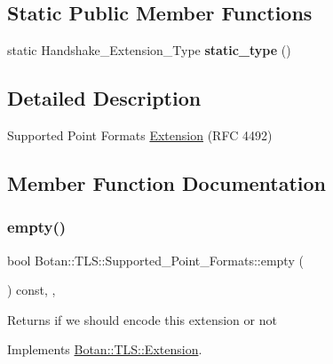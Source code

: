 \subsection*{Static Public Member Functions}
\begin{DoxyCompactItemize}
\item 
\mbox{\label{class_botan_1_1_t_l_s_1_1_supported___point___formats_a6cfd288d6ba096435f7675aa2aa627ce}} 
static Handshake\+\_\+\+Extension\+\_\+\+Type {\bfseries static\+\_\+type} ()
\end{DoxyCompactItemize}


\subsection{Detailed Description}
Supported Point Formats \hyperlink{class_botan_1_1_t_l_s_1_1_extension}{Extension} (R\+FC 4492) 

\subsection{Member Function Documentation}
\mbox{\label{class_botan_1_1_t_l_s_1_1_supported___point___formats_a66014f1fe0e75931f0c7a682aa9d9083}} 
\subsubsection{\texorpdfstring{empty()}{empty()}}
{\footnotesize\ttfamily bool Botan\+::\+T\+L\+S\+::\+Supported\+\_\+\+Point\+\_\+\+Formats\+::empty (\begin{DoxyParamCaption}{ }\end{DoxyParamCaption}) const\hspace{0.3cm}{\ttfamily [inline]}, {\ttfamily [override]}, {\ttfamily [virtual]}}

\begin{DoxyReturn}{Returns}
if we should encode this extension or not 
\end{DoxyReturn}


Implements \hyperlink{class_botan_1_1_t_l_s_1_1_extension_aa850b9be2322f94e7c65e583cd51acc5}{Botan\+::\+T\+L\+S\+::\+Extension}.

